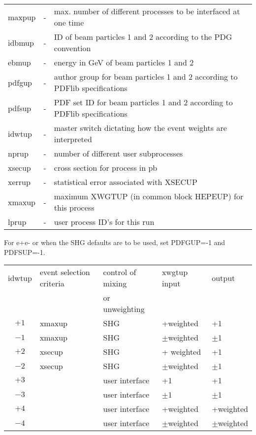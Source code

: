 \begin{center}
\begin{tabular}{lcl}
  maxpup & - & max. number of different processes to be interfaced at one time\\
  idbmup & - & ID of beam particles 1 and 2 according to the PDG convention\\
  ebmup  & - & energy in GeV of beam particles 1 and 2\\
  pdfgup & - & author group for beam particles 1 and 2 according to 
               PDFlib specifications\\
  pdfsup & - & PDF set ID for beam particles 1 and 2 according to 
               PDFlib specifications\\
  idwtup & - & master switch dictating how the event weights are interpreted\\
  nprup  & - & number of different user subprocesses\\
  xsecup & - & cross section for process in pb\\
  xerrup & - & statistical error associated with XSECUP\\
  xmaxup & - & maximum XWGTUP (in common block HEPEUP) for this process\\
  lprup  & - & user process ID's for this run\\
\end{tabular}
\end{center}

For e+e- or when the SHG defaults are to be used, set PDFGUP=-1 and PDFSUP=-1.

\begin{center}
\begin{tabular}{cllll}
idwtup & event selection criteria & control of mixing &
    xwgtup input & output \\
 &  &  or unweighting & & \\
  $+1$	& xmaxup	&	SHG		& +weighted	& +1 \\
  $-1$	& xmaxup	&	SHG		& $\pm$weighted	& $\pm$1 \\
  $+2$	& xsecup	&	SHG		& + weighted	& +1 \\
  $-2$	& xsecup	&	SHG		& $\pm$weighted	& $\pm$1 \\
  $+3$	& 		& user interface	& +1		& +1 \\
  $-3$	& 		& user interface	& $\pm$1	& $\pm$1 \\
  $+4$	& 		& user interface	& +weighted	& +weighted \\
  $-4$	& 		& user interface	& $\pm$weighted	& $\pm$weighted \\
\end{tabular}
\end{center}


